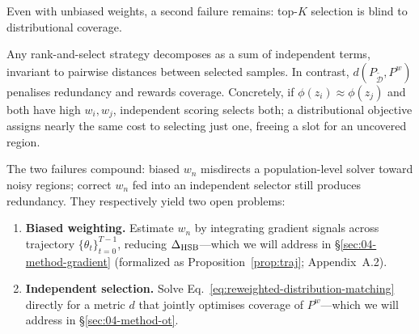 \begin{foldable} %
  Even with unbiased weights, a second failure remains: top-$K$ selection is blind to distributional coverage.
  \begin{remark} \label{rem:coverage}
    Any rank-and-select strategy decomposes as a sum of independent terms, invariant to pairwise distances between selected samples.
    In contrast, $d(P_{\tilde{\mathcal{D}}}, P^w)$ penalises redundancy and rewards coverage.
    Concretely, if $\phi(z_i) \approx \phi(z_j)$ and both have high $w_i, w_j$, independent scoring selects both; a distributional objective assigns nearly the same cost to selecting just one, freeing a slot for an uncovered region.
  \end{remark}
\end{foldable}

\begin{foldable} %
  The two failures compound: biased $w_n$ misdirects a population-level solver toward noisy regions; correct $w_n$ fed into an independent selector still produces redundancy.
  They respectively yield two open problems:
  \begin{enumerate}[label=\textbf{(\alph*)}]
    \item \label{open-problem-weight} \textbf{Biased weighting.} Estimate $w_n$ by integrating gradient signals across trajectory $\{\theta_t\}_{t=0}^{T-1}$, reducing $\Delta_\textup{HSB}$---which we will address in \S\ref{sec:04-method-gradient} (formalized as Proposition~\ref{prop:traj}; Appendix~A.2).
    \item \label{open-problem-select} \textbf{Independent selection.} Solve Eq.~\ref{eq:reweighted-distribution-matching} directly for a metric $d$ that jointly optimises coverage of $P^w$---which we will address in \S\ref{sec:04-method-ot}.
  \end{enumerate}
\end{foldable}
